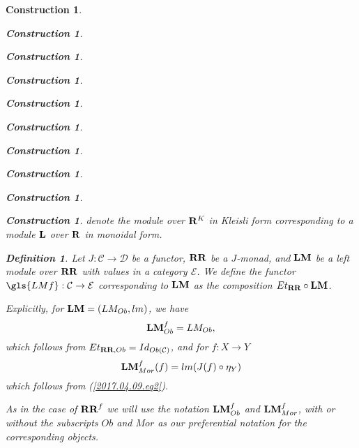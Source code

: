 \documentclass[onecolumn,12pt]{amsart}
\newtheorem{definition}[proposition]{Definition}
\numberwithin{proposition}{subsection}
\newtheorem{construction}[proposition]{Construction}
\newcommand{\sr}{\rightarrow}
\newcommand{\R}{{\bf R}}
\newcommand{\RR}{{\bf RR}}
\newcommand{\LM}{{\bf LM}}
\newcommand{\C}{{\mathcal C}}
\newcommand{\D}{{\mathcal D}}
\newcommand{\E}{{\mathcal E}}
\begin{document}
\begin{construction}
\begin{construction}
\begin{construction}
\begin{construction}
\begin{construction}
\begin{construction}
\begin{construction}
\begin{construction}
\begin{construction}
\begin{construction}
denote the module over $\R^K$ in Kleisli form corresponding to a module
${\bf L}$ over $\R$ in monoidal form.
%
\begin{definition}
\label{2017.04.05.def1} 
Let $J:\C\sr\D$ be a functor, $\RR$ be a $J$-monad, and
$\LM$ be a left module over $\RR$ with values in a category $\E$. We define the
functor $\gls{LMf}:\C\sr \E$ corresponding to $\LM$ as the composition
$Et_{\RR}\circ \LM$.
\end{definition}
%
Explicitly, for $\LM=(LM_{Ob},lm)$, we have
%
$$\LM^f_{Ob}=LM_{Ob},$$
%
which follows from $Et_{\RR,Ob}=Id_{Ob(\C)}$, and for $f:X\sr Y$ 
%
\begin{equation}\label{2017.04.11.eq5}
\LM^f_{Mor}(f)=lm(J(f)\circ \eta_{Y})
\end{equation}%
%
which follows from (\ref{2017.04.09.eq2}). 

As in the case of $\RR^f$ we will use the notation $\LM^f_{Ob}$ and
$\LM^f_{Mor}$, with or without the subscripts $Ob$ and $Mor$ as our
preferential notation for the corresponding objects.


\end{construction}
\end{construction}
\end{construction}
\end{construction}
\end{construction}
\end{construction}
\end{construction}
\end{construction}
\end{construction}
\end{construction}
\end{document}
